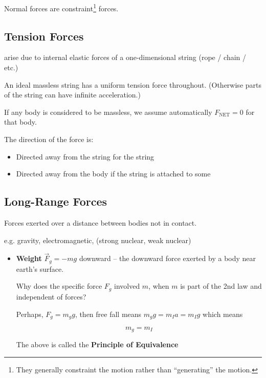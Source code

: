 \begin{remark}
	Normal forces are constraint\footnote{They generally constraint the motion rather than ``generating'' the motion.} forces.
\end{remark}

\subsection{Tension Forces}

arise due to internal elastic forces of a one-dimensional string (rope / chain / etc.)

An ideal massless string has a uniform tension force throughout. (Otherwise parts of the string can have infinite acceleration.)

\begin{remark}
	If any body is considered to be massless, we assume automatically $F_\mathrm{NET} = 0$ for that body. 
\end{remark}

The direction of the force is:

\begin{itemize}
	\item Directed away from the string for the string
	\item Directed away from the body if the string is attached to some
\end{itemize}

\subsection{Long-Range Forces}

Forces exerted over a distance between bodies not in contact.

e.g. gravity, electromagnetic, (strong nuclear, weak nuclear)

\begin{itemize}
	\item \textbf{Weight} $\vec F_g = -mg$ downward -- the downward force exerted by a body near earth's surface.

	\begin{remark}
		Why does the specific force $F_g$ involved $m$, when $m$ is part of the 2nd law and independent of forces?

		Perhaps, $F_g = m_g g$, then free fall means $m_g g = m_I a = m_I g$ which means

		\begin{equation}
			m_g = m_I
		\end{equation}

		The above is called the \textbf{Principle of Equivalence}
	\end{remark}
\end{itemize}

